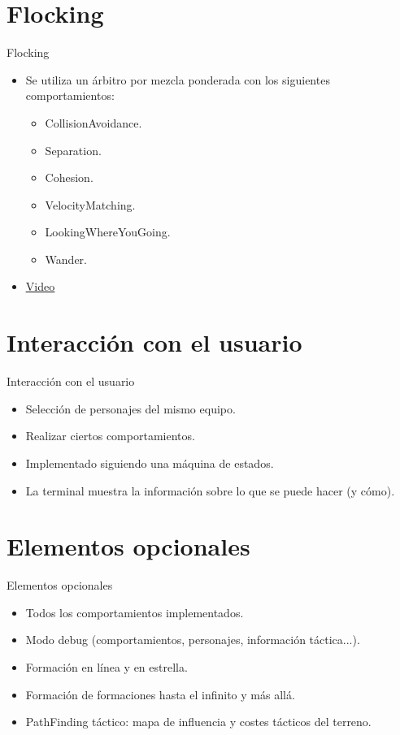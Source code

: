 \documentclass[10pt]{beamer}
\begin{document}
\section{Flocking}
\begin{frame}{Flocking}
\begin{itemize}[<+- | alert@+>]
	\item Se utiliza un árbitro por mezcla ponderada con los siguientes comportamientos:
	\begin{itemize}[<+- | alert@+>]
		\item CollisionAvoidance.
		\item Separation.
		\item Cohesion.
		\item VelocityMatching.
		\item LookingWhereYouGoing.
		\item Wander.
	\end{itemize}
	\item \href{videos/TestFlocking.mp4}{\color{blue}\underline{Video}}
\end{itemize}
\end{frame}

\section{Interacción con el usuario}
\begin{frame}{Interacción con el usuario}
\begin{itemize}[<+- | alert@+>]
	\item Selección de personajes del mismo equipo.
	\item Realizar ciertos comportamientos.
	\item Implementado siguiendo una máquina de estados.
	\item La terminal muestra la información sobre lo que se puede hacer (y cómo).
\end{itemize}
\end{frame}

\section{Elementos opcionales}
\begin{frame}{Elementos opcionales}
\begin{itemize}[<+- | alert@+>]
	\item Todos los comportamientos implementados.
	\item Modo debug (comportamientos, personajes, información táctica...).
	\item Formación en línea y en estrella.
	\item Formación de formaciones hasta el infinito y más allá.
	\item PathFinding táctico: mapa de influencia y costes tácticos del terreno.
\end{itemize}
\end{frame}
\end{document}
